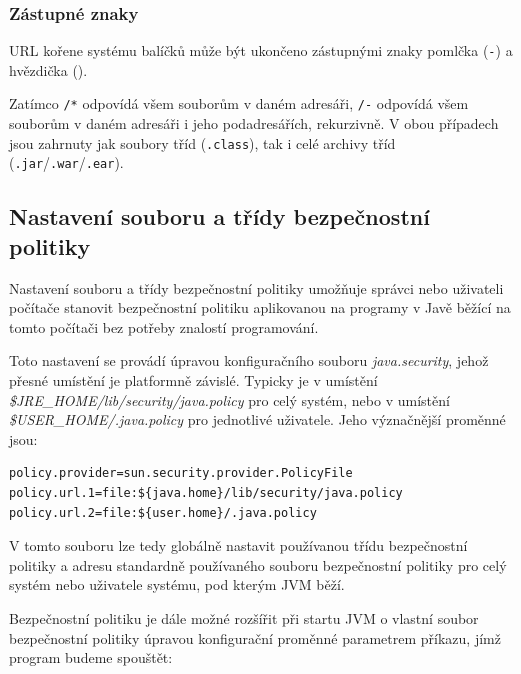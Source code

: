 \subsubsection{Zástupné znaky}

URL kořene systému balíčků může být ukončeno zástupnými znaky pomlčka ({\tt -}) a hvězdička ({\tt *}).

Zatímco {\tt /*} odpovídá všem souborům v daném adresáři, {\tt /-} odpovídá všem souborům v daném adresáři i jeho podadresářích, rekurzivně. V obou případech jsou zahrnuty jak soubory tříd ({\tt .class}), tak i celé archivy tříd ({\tt .jar}/{\tt .war}/{\tt .ear}).
\cite{jdkdocPolicyFiles}

\subsection{Nastavení souboru a třídy bezpečnostní politiky}\label{souborPolitiky}

Nastavení souboru a třídy bezpečnostní politiky umožňuje správci nebo uživateli počítače stanovit bezpečnostní politiku aplikovanou na programy v Javě běžící na tomto počítači bez potřeby znalostí programování.

Toto nastavení se provádí úpravou konfiguračního souboru {\it java.security}, jehož přesné umístění je platformně závislé. Typicky je v umístění {\it \$JRE\_HOME/lib/security/java.policy} pro celý systém, nebo v umístění {\it \$USER\_HOME/.java.policy} pro jednotlivé uživatele. \cite{refSecurity}
Jeho význačnější proměnné jsou: \cite[5.3.1]{oaks}

\begin{verbatim}
policy.provider=sun.security.provider.PolicyFile
policy.url.1=file:${java.home}/lib/security/java.policy
policy.url.2=file:${user.home}/.java.policy
\end{verbatim}

V tomto souboru lze tedy globálně nastavit používanou třídu bezpečnostní politiky a adresu standardně používaného souboru bezpečnostní politiky pro celý systém nebo uživatele systému, pod kterým JVM běží.

Bezpečnostní politiku je dále možné rozšířit při startu JVM o vlastní soubor bezpečnostní politiky úpravou konfigurační proměnné parametrem příkazu, jímž program budeme spouštět: \cite[5.3.1]{oaks}

